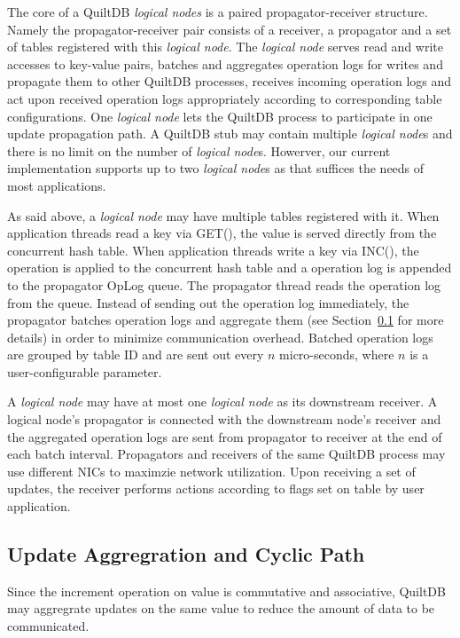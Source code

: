\documentclass[11pt, twocolumn]{article}
\begin{document}
The core of a QuiltDB \emph{logical nodes} is a paired propagator-receiver
structure. Namely the propagator-receiver pair consists
of a receiver, a propagator and a set of tables registered with this
\emph{logical node}. The \emph{logical node} serves read and write accesses to
key-value pairs, batches and aggregates operation logs for writes and propagate
them to other QuiltDB processes, receives incoming operation logs and act upon
received operation logs appropriately according to corresponding table
configurations. One \emph{logical node} lets the QuiltDB process to participate
in one update propagation path. A QuiltDB stub may contain multiple
\emph{logical node}s and there is no limit on the number of \emph{logical
node}s. Howerver, our current implementation supports up to two \emph{logical
node}s as that suffices the needs of most applications.

As said above, a \emph{logical node} may have multiple tables registered with it.
When application threads read a key via GET(), the value is served directly from
the concurrent hash table. When application threads write a key via INC(), the
operation is applied to the concurrent hash table and a operation log is
appended to the propagator OpLog queue. The propagator thread reads the
operation log from the queue. Instead of sending out the operation log
immediately, the propagator batches operation logs and aggregate them (see
Section~\ref{sec:update-aggreg} for more details) in order to minimize
communication overhead. Batched operation logs are grouped by table ID and are
sent out every $n$ micro-seconds, where $n$ is a user-configurable parameter.

A \emph{logical node} may have at most one \emph{logical node} as its downstream
receiver. A logical node's propagator is connected with the downstream node's
receiver and the aggregated operation logs are sent from propagator to receiver
at the end of each batch interval. Propagators and receivers of the same QuiltDB
process may use different NICs to maximzie network utilization. Upon receiving
a set of updates, the receiver performs actions according to flags set on table
by user application.

\subsection{Update Aggregration and Cyclic Path}
\label{sec:update-aggreg}
\label{sec:cyclic-path}

Since the increment operation on value is commutative and associative, QuiltDB
may aggregrate updates on the same value to reduce the amount of data to be
communicated.
\end{document}
